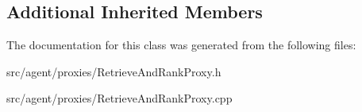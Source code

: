 \subsection*{Additional Inherited Members}


The documentation for this class was generated from the following files\+:\begin{DoxyCompactItemize}
\item 
src/agent/proxies/Retrieve\+And\+Rank\+Proxy.\+h\item 
src/agent/proxies/Retrieve\+And\+Rank\+Proxy.\+cpp\end{DoxyCompactItemize}

